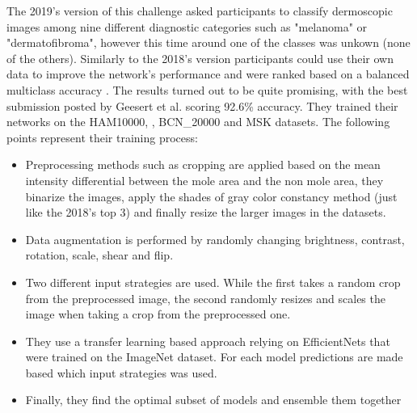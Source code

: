\documentclass[journal,compsoc]{IEEEtran}
\begin{document}
The 2019's version of this challenge asked participants to classify dermoscopic images among nine different diagnostic categories such as "melanoma" or "dermatofibroma", however this time around one of the classes was unkown (none of the others). Similarly to the 2018's version participants could use their own data to improve the network's performance and were ranked based on a balanced multiclass accuracy \cite{isic2019}. 
The results turned out to be quite promising, with the best submission posted by Geesert et al. \cite{isic2019first} scoring 92.6\% accuracy. They trained their networks on the HAM10000, \cite{ham10000}, BCN\_20000 \cite{bcn_20000} and MSK \cite{msk} datasets. The following points represent their training process:  
\begin{itemize}
\item Preprocessing methods such as cropping are applied based on the mean intensity differential between the mole area and the non mole area, they binarize the images, apply the shades of gray color constancy method (just like the 2018's top 3) and finally resize the larger images in the datasets. 
\item Data augmentation is performed by randomly changing brightness, contrast, rotation, scale, shear and flip.
\item Two different input strategies are used. While the first takes a random crop from the preprocessed image, the second randomly resizes and scales the image when taking a crop from the preprocessed one.
\item They use a transfer learning based approach relying on EfficientNets that were trained on the ImageNet dataset. For each model predictions are made based which input strategies was used. 
\item Finally, they find the optimal subset of models and ensemble them together
\end{itemize}
\end{document}
